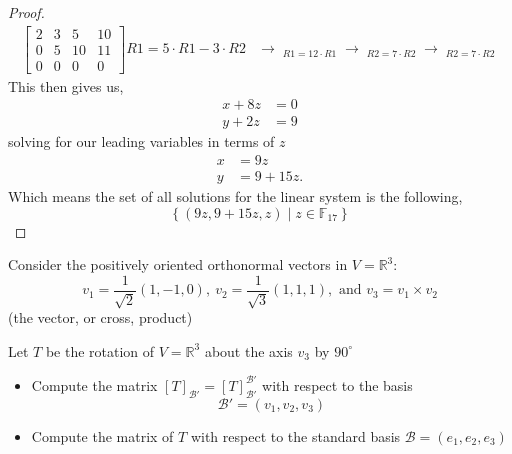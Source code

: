 \documentclass[11pt]{article}
\newenvironment{problem}[2][Problem\!]{\begin{trivlist}
\item[\hskip \labelsep {\bfseries #1}\hskip \labelsep {\bfseries #2}]}{\end{trivlist}}
\newcommand{\rr}{\mathbb R}   %
\newcommand{\set}[1]{\left\{#1\right\}} %
\newcommand*{\putunder}[2]{%
  {\mathop{#1}_{\textstyle #2}}%
}
\begin{document}
\begin{proof}
\begin{align*}
{\begin{bmatrix}
      2 & 3 & 5 & 10 \\
      0 & 5 & 10 & 11 \\
      0 & 0 & 0 & 0 
    \end{bmatrix}}{R1 = 5\cdot R1 - 3\cdot R2} 
    &\rightarrow \putunder{\begin{bmatrix}
      10 & 0 & 12 & 10 \\
      0 & 5 & 10 & 11 \\
      0 & 0 & 0 & 0 
    \end{bmatrix}}{R1 = 12\cdot R1} \rightarrow \putunder{\begin{bmatrix}
      1 & 0 & 8 & 0 \\
      0 & 5 & 10 & 11 \\
      0 & 0 & 0 & 0 
    \end{bmatrix}}{R2 = 7\cdot R2} \rightarrow \putunder{\begin{bmatrix}
      1 & 0 & 8 & 0 \\
      0 & 1 & 2 & 9 \\
      0 & 0 & 0 & 0 
    \end{bmatrix}}{R2 = 7\cdot R2}
  \end{align*}
  This then gives us,
  \begin{align*}
    x + 8z &= 0 \\
    y + 2z &= 9
  \end{align*}
  solving for our leading variables in terms of $z$
  \begin{align*}
    x &= 9z \\
    y &= 9 + 15z.
  \end{align*}
  Which means the set of all solutions for the linear system is the following,
  \[\set{(9z, 9 + 15z, z) \mid z\in \mathbb{F}_{17}}\]

  

\end{proof}

\newpage
\begin{tcolorbox}
  \begin{problem} {P3}
    Consider the positively oriented orthonormal vectors in $V = \rr^{3}$:
    \[v_1 = \frac{1}{\sqrt{2}}(1,-1,0), \ v_2 = \frac{1}{\sqrt{3}}(1,1,1), \text{ and } v_3 = v_1 \times v_2\]
    (the vector, or cross, product)

    Let $T$ be the rotation of $V = \rr^{3}$ about the axis $v_3$ by $90^{\circ}$

    \begin{itemize}
      \item[(1)] Compute the matrix $[T]_{\mathcal{B}'} = [T]_{\mathcal{B}'}^{\mathcal{B}'}$ with respect to the basis 
      \[\mathcal{B'} = (v_1, v_2, v_3)\]
      \item[(2)] Compute the matrix of $T$ with respect to the standard basis $\mathcal{B} = (e_1, e_2, e_3)$ 
    \end{itemize}
  \end{problem}
\end{tcolorbox}
\end{document}
